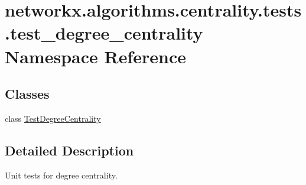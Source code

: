 \hypertarget{namespacenetworkx_1_1algorithms_1_1centrality_1_1tests_1_1test__degree__centrality}{}\section{networkx.\+algorithms.\+centrality.\+tests.\+test\+\_\+degree\+\_\+centrality Namespace Reference}
\label{namespacenetworkx_1_1algorithms_1_1centrality_1_1tests_1_1test__degree__centrality}
\subsection*{Classes}
\begin{DoxyCompactItemize}
\item 
class \hyperlink{classnetworkx_1_1algorithms_1_1centrality_1_1tests_1_1test__degree__centrality_1_1TestDegreeCentrality}{Test\+Degree\+Centrality}
\end{DoxyCompactItemize}


\subsection{Detailed Description}
\begin{DoxyVerb}Unit tests for degree centrality.
\end{DoxyVerb}
 
